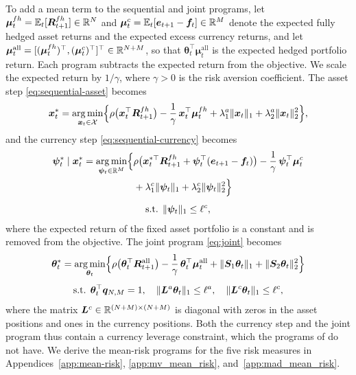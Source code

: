 To add a mean term to the sequential and joint programs, let
$\bm{\mu}^{fh}_t = \mathbb{E}_t[\bm{R}^{fh}_{t+1}] \in \mathbb{R}^N$ and
$\bm{\mu}^c_t = \mathbb{E}_t[\bm{e}_{t+1} - \bm{f}_t] \in \mathbb{R}^M$ denote the expected fully hedged asset returns and the
expected excess currency returns, and let
$\bm{\mu}^{\text{all}}_t = [(\bm{\mu}^{fh}_t)^\top, (\bm{\mu}^c_t)^\top]^\top \in \mathbb{R}^{N+M}$, so that
$\bm{\theta}_t^\top \bm{\mu}^{\text{all}}_t$ is the expected hedged portfolio return. Each program subtracts the
expected return from the objective. We scale the expected return by $1/\gamma$, where $\gamma > 0$ is the risk
aversion coefficient. The asset step \eqref{eq:sequential-asset} becomes
\begin{equation}
    \bm{x}_t^* = \operatorname*{arg\,min}_{\bm{x}_t \in \mathcal{X}} \Bigl\{ \rho\bigl( \bm{x}_t^\top \bm{R}^{fh}_{t+1} \bigr)
    - \frac{1}{\gamma}\, \bm{x}_t^\top \bm{\mu}^{fh}_t
    + \lambda_1^a \|\bm{x}_t\|_1 + \lambda_2^a \|\bm{x}_t\|_2^2 \Bigr\},
\end{equation}
and the currency step \eqref{eq:sequential-currency} becomes
\begin{equation}
\begin{gathered}
    \begin{aligned}
    \bm{\psi}_t^* \mid \bm{x}_t^* = \operatorname*{arg\,min}_{\bm{\psi}_t \in \mathbb{R}^M} \Bigl\{ &
    \rho\bigl( \bm{x}_t^{*\top} \bm{R}^{fh}_{t+1} + \bm{\psi}_t^\top (\bm{e}_{t+1} - \bm{f}_t) \bigr)
    - \frac{1}{\gamma}\, \bm{\psi}_t^\top \bm{\mu}^c_t \\
    & + \lambda_1^c \|\bm{\psi}_t\|_1 + \lambda_2^c \|\bm{\psi}_t\|_2^2 \Bigr\}
    \end{aligned} \\[4pt]
    \text{s.t. } \|\bm{\psi}_t\|_1 \le \ell^c,
\end{gathered}
\end{equation}
where the expected return of the fixed asset portfolio is a constant and is removed from the objective. The joint program
\eqref{eq:joint} becomes
\begin{equation}
\begin{gathered}
    \bm{\theta}_t^* = \operatorname*{arg\,min}_{\bm{\theta}_t} \Bigl\{ \rho\bigl( \bm{\theta}_t^\top \bm{R}^{\text{all}}_{t+1} \bigr)
    - \frac{1}{\gamma}\, \bm{\theta}_t^\top \bm{\mu}^{\text{all}}_t
    + \|\bm{S}_1 \bm{\theta}_t\|_1 + \|\bm{S}_2 \bm{\theta}_t\|_2^2 \Bigr\} \\[4pt]
    \text{s.t. } \bm{\theta}_t^\top \bm{q}_{N,M} = 1, \quad \|\bm{L}^a \bm{\theta}_t\|_1 \le \ell^a, \quad
    \|\bm{L}^c \bm{\theta}_t\|_1 \le \ell^c,
\end{gathered}
\end{equation}
where the matrix $\bm{L}^c \in \mathbb{R}^{(N+M) \times (N+M)}$ is diagonal with zeros in the asset positions and ones in the
currency positions. Both the currency step and the joint program thus contain a currency leverage constraint, which
the programs of  do not have. We derive the mean-risk programs for the five risk
measures in Appendices~\ref{app:mean-risk}, \ref{app:mv_mean_risk}, and~\ref{app:mad_mean_risk}.


